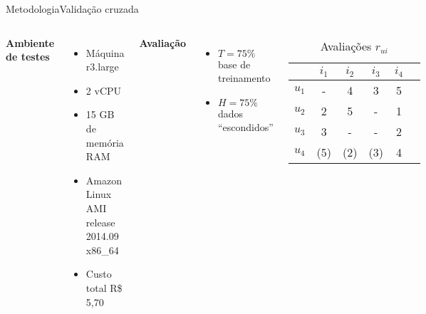 \begin{frame}{Metodologia}{Validação cruzada}
\begin{columns}[t] 
\textbf{Ambiente de testes} 
\begin{itemize}
 	\item Máquina r3.large
 	\item 2 vCPU
 	\item 15 GB de memória RAM
 	\item Amazon Linux AMI release 2014.09 x86\_64
 	\item Custo total R\$ 5,70
 \end{itemize}
\textbf{Avaliação}
\begin{itemize}
	\item $T=75\%$ base de treinamento
	\item $H=75\%$ dados ``escondidos''
\end{itemize}
\begin{table}[h]
\begin{center}
	\caption{Avaliações $r_{ui}$}
    \begin{tabular}{ | c | c | c | c | c | c |} 
    \hline
     & $i_1$ & $i_2$ & $i_3$ & $i_4$ \\ \hline
     $u_1$ & - & 4 & 3 & 5 \\ \hline
     $u_2$ & 2 & 5 & - & 1 \\ \hline
     $u_3$ & 3 & - & - & 2 \\ \hline
     $u_4$ & (5) & (2) & (3) & 4 \\ \hline
    \end{tabular}
\end{center}
\end{table}
\end{columns}
\end{frame}